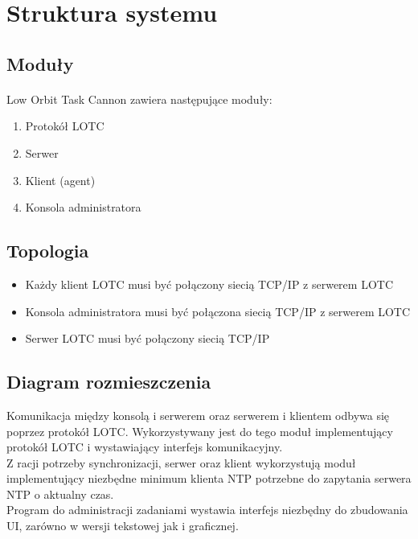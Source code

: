 \documentclass[10pt,a4paper]{article}
\begin{document}
	\section{Struktura systemu}
	
	    \subsection{Moduły}	
	        \paragraph{}
		    Low Orbit Task Cannon zawiera następujące moduły:
		
			\begin{enumerate}
		        \item Protokół LOTC
		        \item Serwer
		        \item Klient (agent)
		        \item Konsola administratora
		    \end{enumerate}
		    
	    \subsection{Topologia}
	    
		    \begin{itemize}
		        \item Każdy klient LOTC musi być połączony siecią TCP/IP z serwerem LOTC
		        \item Konsola administratora musi być połączona siecią TCP/IP z serwerem LOTC 
		        \item Serwer LOTC musi być połączony siecią TCP/IP
		    \end{itemize}
		    
		    \begin{figure}[H]
				\def\svgwidth{\columnwidth}
				
			\end{figure}
			
        \pagebreak			
			
	    \subsection{Diagram rozmieszczenia}
		    Komunikacja między konsolą i serwerem oraz serwerem i klientem odbywa się poprzez protokół LOTC. Wykorzystywany jest do tego moduł implementujący protokół LOTC i wystawiający interfejs komunikacyjny. \\
		    Z racji potrzeby synchronizacji, serwer oraz klient wykorzystują moduł implementujący niezbędne minimum klienta NTP potrzebne do zapytania serwera NTP o aktualny czas. \\
		    Program do administracji zadaniami wystawia interfejs niezbędny do zbudowania UI, zarówno w wersji tekstowej jak i graficznej. \\
		    
\end{document}
